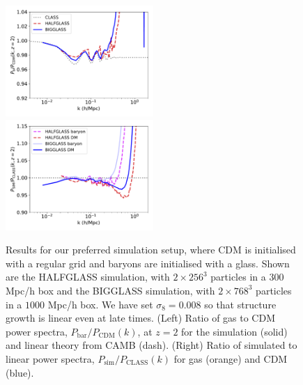 \documentclass[a4paper,11pt]{article}
\begin{document}
\begin{figure}
\includegraphics[width=0.5\textwidth]{plots/halfglass_2_relpower.pdf}
  \includegraphics[width=0.5\textwidth]{plots/halfglass_2_class.pdf}
\caption{Results for our preferred simulation setup, where CDM is initialised with a regular grid and baryons are initialised with a glass. Shown are the HALFGLASS simulation, with $2\times 256^3$ particles in a $300$ Mpc/h box and the BIGGLASS simulation, with $2\times 768^3$ particles in a $1000$ Mpc/h box. We have set $\sigma_8 = 0.008$ so that structure growth is linear even at late times. (Left) Ratio of gas to CDM power spectra, $P_\mathrm{bar}/P_\mathrm{CDM}(k)$, at $z=2$ for the simulation (solid) and linear theory from CAMB (dash). (Right) Ratio of simulated to linear power spectra, $P_\mathrm{sim}/P_\mathrm{CLASS}(k)$ for gas (orange) and CDM (blue).}
  \label{fig:baryonglass}
\end{figure}
\end{document}
